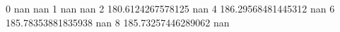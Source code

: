 0 nan nan
1 nan nan
2 180.6124267578125 nan
4 186.29568481445312 nan
6 185.78353881835938 nan
8 185.73257446289062 nan
